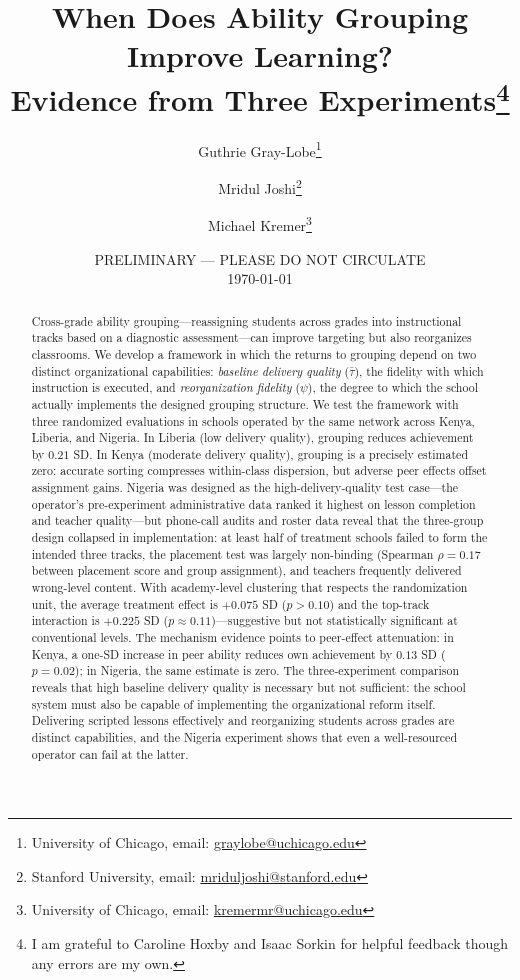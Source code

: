 \documentclass[11pt]{article}
\title{When Does Ability Grouping Improve Learning? \\ Evidence from Three Experiments\footnote{I am grateful to Caroline Hoxby and Isaac Sorkin for helpful feedback though any errors are my own. } }
\begin{document}
\begin{titlepage}
\author{Guthrie Gray-Lobe\thanks{University of Chicago, email: \protect\href{mailto:graylobe@uchicago.edu}{graylobe@uchicago.edu}} \and Mridul Joshi\thanks{Stanford University, email: \protect\href{mailto:mriduljoshi@stanford.edu}{mriduljoshi@stanford.edu}} \and Michael Kremer\thanks{University of Chicago, email: \protect\href{mailto:kremermr@uchicago.edu}{kremermr@uchicago.edu}}}

\date{PRELIMINARY --- PLEASE DO NOT CIRCULATE \\ \today}
\maketitle

\begin{abstract}\noindent
Cross-grade ability grouping---reassigning students across grades into instructional tracks based on a diagnostic assessment---can improve targeting but also reorganizes classrooms. We develop a framework in which the returns to grouping depend on two distinct organizational capabilities: \emph{baseline delivery quality} ($\bar{\tau}$), the fidelity with which instruction is executed, and \emph{reorganization fidelity} ($\psi$), the degree to which the school actually implements the designed grouping structure. We test the framework with three randomized evaluations in schools operated by the same network across Kenya, Liberia, and Nigeria. In Liberia (low delivery quality), grouping reduces achievement by $0.21$ SD. In Kenya (moderate delivery quality), grouping is a precisely estimated zero: accurate sorting compresses within-class dispersion, but adverse peer effects offset assignment gains. Nigeria was designed as the high-delivery-quality test case---the operator's pre-experiment administrative data ranked it highest on lesson completion and teacher quality---but phone-call audits and roster data reveal that the three-group design collapsed in implementation: at least half of treatment schools failed to form the intended three tracks, the placement test was largely non-binding (Spearman $\rho = 0.17$ between placement score and group assignment), and teachers frequently delivered wrong-level content. With academy-level clustering that respects the randomization unit, the average treatment effect is $+0.075$ SD ($p > 0.10$) and the top-track interaction is $+0.225$ SD ($p \approx 0.11$)---suggestive but not statistically significant at conventional levels. The mechanism evidence points to peer-effect attenuation: in Kenya, a one-SD increase in peer ability reduces own achievement by $0.13$ SD ($p = 0.02$); in Nigeria, the same estimate is zero. The three-experiment comparison reveals that high baseline delivery quality is necessary but not sufficient: the school system must also be capable of implementing the organizational reform itself. Delivering scripted lessons effectively and reorganizing students across grades are distinct capabilities, and the Nigeria experiment shows that even a well-resourced operator can fail at the latter.

\end{abstract}
\setcounter{page}{0}
\thispagestyle{empty}
\end{titlepage}
\doublespacing
\end{document}
